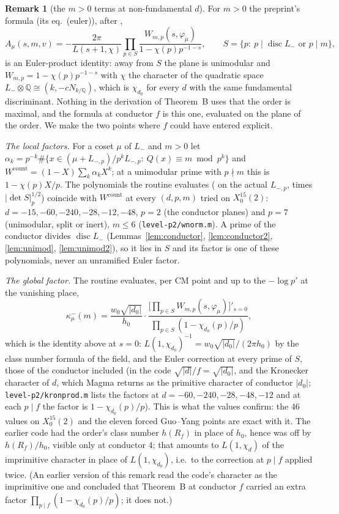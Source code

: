 \documentclass[11pt,reqno]{amsart}
\theoremstyle{plain}
\theoremstyle{definition}
\newtheorem{remark}[theorem]{Remark}
\DeclareMathOperator{\disc}{disc}
\newcommand{\Q}{\mathbb{Q}}
\newcommand{\Lm}{L_{-}}
\begin{document}
\begin{remark}[the $m>0$ terms at non-fundamental $d$]\label{rem:mpos}
For $m>0$ the preprint's formula (its eq.~(euler)), after \cite{Yang},
\[
  A_\mu(s,m,v)=-\frac{2\pi}{L(s+1,\chi)}\prod_{p\in S}\frac{W_{m,p}(s,\varphi_\mu)}{1-\chi(p)p^{-1-s}},
  \qquad S=\{p:\ p\mid\disc\Lm\text{ or }p\mid m\},
\]
is an Euler-product identity: away from $S$ the plane is unimodular and $W_{m,p}=1-\chi(p)p^{-1-s}$
with $\chi$ the character of the quadratic space $\Lm\otimes\Q\cong(k,-cN_{k/\Q})$, which is
$\chi_{d_0}$ for every $d$ with the same fundamental discriminant. Nothing in the derivation of
Theorem~B uses that the order is maximal, and the formula at conductor $f$ is this one, evaluated on
the plane of the order. We make the two points where $f$ could have entered explicit.

\emph{The local factors.} For a coset $\mu$ of $\Lm$ and $m>0$ let
$\alpha_k=p^{-k}\#\{x\in(\mu+L_{-,p})/p^kL_{-,p}:\ Q(x)\equiv m\bmod p^k\}$ and $W^{\mathrm{count}}=(1-X)
\sum_k\alpha_kX^k$; at a unimodular prime with $p\nmid m$ this is $1-\chi(p)X/p$. The polynomials
the routine evaluates (\cite[Thm.~4.3, 4.4]{KY} on the actual $L_{-,p}$, times $|\det S|_p^{1/2}$)
coincide with $W^{\mathrm{count}}$ at every $(d,p,m)$ tried on $X_0^{15}(2)$: $d=-15,-60,-240,-28,-12,
-48$, $p=2$ (the conductor planes) and $p=7$ (unimodular, split or inert), $m\le6$
(\texttt{level-p2/wnorm.m}). A prime of the conductor divides $\disc\Lm$ (Lemmas~\ref{lem:conductor},
\ref{lem:conductor2}, \ref{lem:unimod}, \ref{lem:unimod2}), so it lies in $S$ and its factor is one
of these polynomials, never an unramified Euler factor.

\emph{The global factor.} The routine evaluates, per CM point and up to the $-\log p'$ at the
vanishing place,
\[
  \kappa^-_\mu(m)=\frac{w_0\sqrt{\lvert d_0\rvert}}{h_0}\cdot
  \frac{\bigl[\prod_{p\in S}W_{m,p}(s,\varphi_\mu)\bigr]'_{s=0}}{\prod_{p\in S}(1-\chi_{d_0}(p)/p)},
\]
which is the identity above at $s=0$: $L(1,\chi_{d_0})^{-1}=w_0\sqrt{\lvert d_0\rvert}/(2\pi h_0)$ by
the class number formula of the field, and the Euler correction at every prime of $S$, those of the
conductor included (in the code $\sqrt{\lvert d\rvert}/f=\sqrt{\lvert d_0\rvert}$, and the Kronecker
character of $d$, which Magma returns as the primitive character of conductor $\lvert d_0\rvert$;
\texttt{level-p2/kronprod.m} lists the factors at $d=-60,-240,-28,-48,-12$ and at each $p\mid f$ the
factor is $1-\chi_{d_0}(p)/p$). This is what the values confirm: the $46$ values on $X_0^{15}(2)$ and
the eleven forced Guo--Yang points are exact with it. The earlier code had the order's class number
$h(R_f)$ in place of $h_0$, hence was off by $h(R_f)/h_0$, visible only at conductor $4$; that
amounts to $L(1,\chi_d)$ of the imprimitive character in place of $L(1,\chi_{d_0})$, i.e.\ to the
correction at $p\mid f$ applied twice. (An earlier version of this remark read the code's character
as the imprimitive one and concluded that Theorem~B at conductor $f$ carried an extra factor
$\prod_{p\mid f}(1-\chi_{d_0}(p)/p)$; it does not.)


\end{remark}
\end{document}
